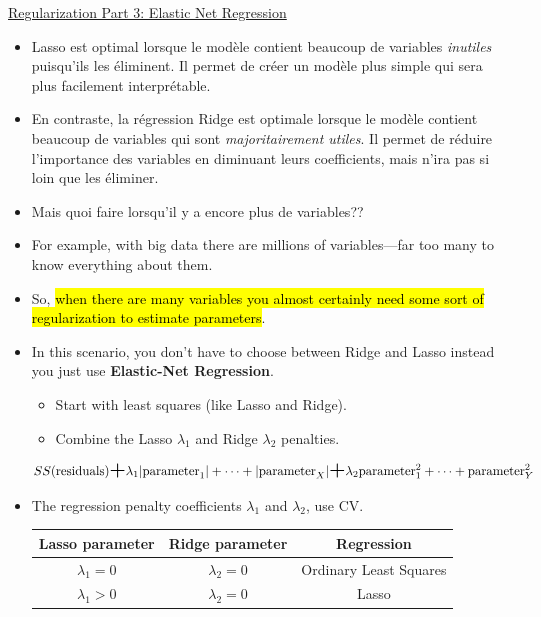 \documentclass[12pt, titlepage, french]{report}
\begin{document}
\begin{YTB_SUMM_AUTO_NUMB}[label = {SQ-reg-3-elasticnet}]{\href{https://www.youtube.com/watch?v=1dKRdX9bfIo&feature=youtu.be}{Regularization Part 3: Elastic Net Regression}}
\begin{itemize}[leftmargin = *]
	\item	Lasso est optimal lorsque le modèle contient beaucoup de variables \textit{inutiles} puisqu'ils les éliminent.
	 		Il permet de créer un modèle plus simple qui sera plus facilement interprétable. 
	\item	En contraste, la régression Ridge est optimale lorsque le modèle contient beaucoup de variables qui sont \textit{majoritairement utiles}. Il permet de réduire l'importance des variables en diminuant leurs coefficients, mais n'ira pas si loin que les éliminer.
	\item	Mais quoi faire lorsqu'il y a encore plus de variables??
	\item	For example, with big data there are millions of variables—far too many to know everything about them.
	\item	So, \hl{when there are many variables you almost certainly need some sort of regularization to estimate parameters}.
	\item	In this scenario, you don't have to choose between Ridge and Lasso instead you just use \textbf{Elastic-Net Regression}.
		\begin{itemize}[leftmargin = *]
		\item	Start with least squares (like Lasso and Ridge).
		\item	Combine the Lasso $\lambda_{1}$ and Ridge $\lambda_{2}$ penalties.
		\end{itemize}
		\begin{align*}
		SS(\text{residuals}) \textbf{\Large{+}} 
		\lambda_{1} |\text{parameter}_{1}| + \dots + |\text{parameter}_{X}| \textbf{\Large{+}}
		\lambda_{2} \text{parameter}_{1}^{2} + \dots + \text{parameter}_{Y}^{2}
		\end{align*}
	\item	The regression penalty coefficients $\lambda_{1}$ and $\lambda_{2}$, use CV.
		\begin{center}
			\begin{tabular}{|	c	|	c	|	c	|}
			\hline
			Lasso parameter		&	Ridge parameter		&	Regression	\\\hline
			$\lambda_{1} = 0$	&	$\lambda_{2} = 0$	&	Ordinary Least Squares 	\\
			$\lambda_{1} > 0$	&	$\lambda_{2} = 0$	&	Lasso 	\\

\end{tabular}
\end{center}
\end{itemize}
\end{YTB_SUMM_AUTO_NUMB}
\end{document}
